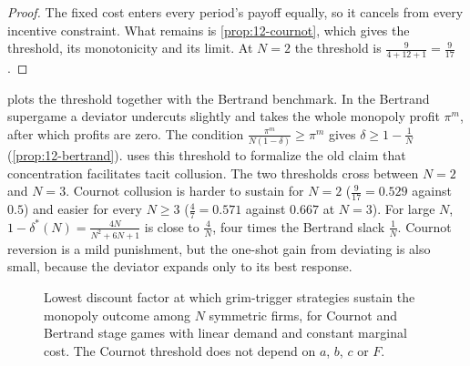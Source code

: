 \begin{proof}
The fixed cost enters every period's payoff equally, so it cancels from every incentive constraint. What remains is
\cref{prop:12-cournot}, which gives the threshold, its monotonicity and its limit. At $N = 2$ the threshold is
$\frac{9}{4 + 12 + 1} = \frac{9}{17}$.
\end{proof}

 plots the threshold together with the Bertrand benchmark. In the Bertrand supergame a
deviator undercuts slightly and takes the whole monopoly profit $\pi^m$, after which profits are zero. The
condition $\frac{\pi^m}{N(1 - \delta)} \ge \pi^m$ gives $\delta \ge 1 - \frac{1}{N}$ (\cref{prop:12-bertrand}).
\citet[Section~6.3.2.1]{Tirole1988} uses this threshold to formalize the old claim that concentration facilitates
tacit collusion.
The two thresholds cross between $N = 2$ and $N = 3$. Cournot collusion is harder to sustain for $N = 2$
($\frac{9}{17} = 0.529$ against $0.5$) and easier for every $N \ge 3$ ($\frac{4}{7} = 0.571$ against $0.667$ at
$N = 3$). For large $N$, $1 - \delta^*(N) = \frac{4N}{N^2 + 6N + 1}$ is close to $\frac{4}{N}$, four
times the Bertrand slack $\frac{1}{N}$. Cournot reversion is a mild punishment, but the one-shot gain from
deviating is also small, because the deviator expands only to its best response.

\begin{figure}[htbp]
\centering
{}
\caption{Lowest discount factor at which grim-trigger strategies sustain the monopoly outcome among $N$
symmetric firms, for Cournot and Bertrand stage games with linear demand and constant marginal cost. The
Cournot threshold does not depend on $a$, $b$, $c$ or $F$.}
\label{fig:C-delta}
\end{figure}

